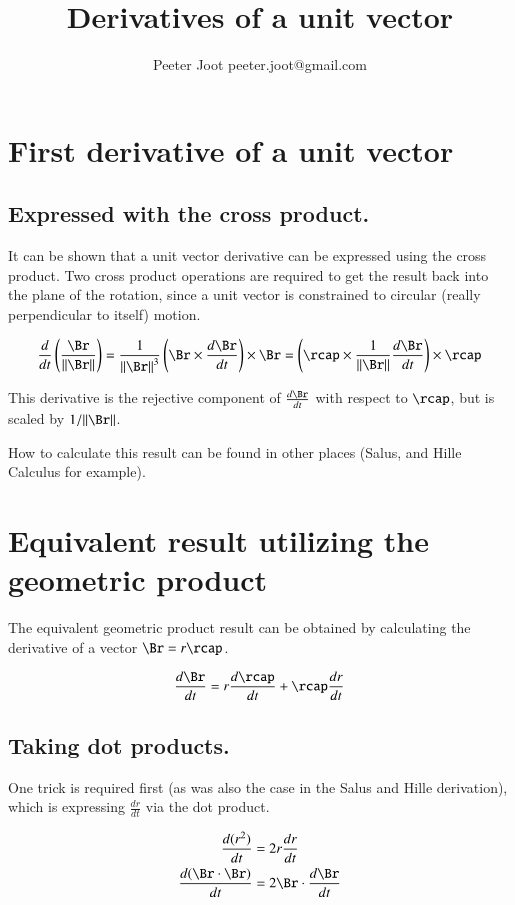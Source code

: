 \documentclass{article}      %
\title{Derivatives of a unit vector}
\author{Peeter Joot \quad peeter.joot@gmail.com}         %
\newcommand{\dt}[1]{\frac{d {#1}}{dt}}
\begin{document}

\maketitle{}

\section{First derivative of a unit vector}

\subsection{Expressed with the cross product.}

It can be shown that a unit vector derivative can be expressed using the cross product.  Two cross product operations are required to get the result back into the plane of the rotation, since a unit vector is constrained to circular (really perpendicular to itself) motion.

\[
\dt{}\left(\frac{\Br}{\Vert \Br \Vert}\right)
= \frac{1}{{\Vert \Br \Vert}^3}\left(\Br \times \dt{\Br}\right) \times \Br
= \left(\rcap \times \frac{1}{{\Vert \Br \Vert}} \dt{\Br}\right) \times \rcap
\]

This derivative is the rejective component of $\dt{\Br}$ with respect to $\rcap$, but is scaled by $1/\Vert \Br \Vert$.

How to calculate this result can be found in other places (Salus, and Hille Calculus for example).

\section{Equivalent result utilizing the geometric product}

The equivalent geometric product result can be obtained by calculating the derivative of a vector $\Br = r \rcap$.

\[
\dt{\Br} = r \dt{\rcap} + \rcap \dt{r} 
\]

\subsection{Taking dot products.}
One trick is required first (as was also the case in the Salus and Hille derivation), which is expressing $\dt{r}$ via the dot product.

\begin{align*}
\dt{(r^2)} &= 2r \dt{r} \\
\dt{(\Br \cdot \Br)} &= 2 \Br \cdot \dt{\Br} \\
\end{align*}
\end{document}
